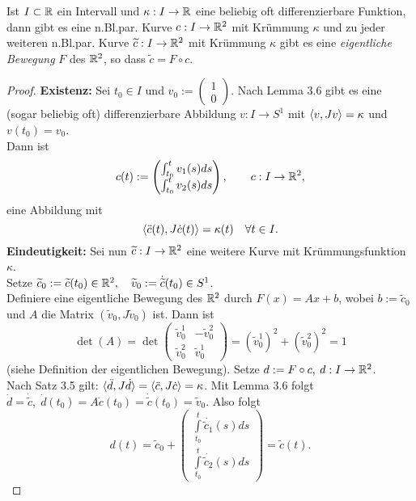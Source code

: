 \documentclass[11pt]{scrbook}
\begin{document}

\begin{st}
Ist $I \subset \mathbb{R}$  ein Intervall und $\kappa : I \to \mathbb{R}$ eine beliebig oft differenzierbare Funktion, dann gibt es eine n.Bl.par. Kurve $c: I \to \mathbb{R}^2$ mit Krümmung $\kappa$ und zu jeder weiteren n.Bl.par. Kurve $\widetilde c: I \to \mathbb{R}^2$ mit Krümmung $\kappa$ gibt es eine \emph{eigentliche Bewegung} $F$ des $\mathbb{R}^2$, so dass $\tilde c = F \circ c$.

\begin{proof}
\textbf{Existenz:}
Sei $t_0 \in I$ und $v_0 := \begin{pmatrix} 1 \\ 0 \end{pmatrix}$. Nach Lemma 3.6 gibt es eine (sogar beliebig oft) differenzierbare Abbildung $v : I \to S^1$ mit $\langle v, Jv \rangle = \kappa$ und $v(t_0) = v_0$. \\
Dann ist
\[ c(t) := \begin{pmatrix}  \int_{t_0}^t v_1(s) ds \\ \int_{t_0}^t v_2(s) ds \end{pmatrix} , \qquad c:I \to \mathbb{R}^2, \]
eine Abbildung mit 
\[ \langle \ddot c(t), J \dot c(t) \rangle = \kappa(t) \quad \forall t \in I. \]
\textbf{Eindeutigkeit:}
Sei nun $\widetilde c: I \to \mathbb{R}^2$ eine weitere Kurve mit Krümmungsfunktion $\kappa$.\\ Setze $\widetilde c_0 := \widetilde c(t_0) \in \mathbb{R}^2, \quad \widetilde v_0 := \dot{\widetilde c}(t_0) \in S^1$. \\
Definiere eine eigentliche Bewegung des $\mathbb{R}^2$ durch $F(x) = Ax + b$, wobei $b := \tilde c_0$ und $A$ die Matrix $(\tilde v_0, J \tilde v_0)$ ist. Dann ist
\[ \det(A) = \det \begin{pmatrix} \tilde v_0^1 & - \tilde v_0^2 \\ \tilde v_0^2 & \tilde v_0^1 \end{pmatrix} = (\tilde v_0^1)^2 + (\tilde v_0^2)^2 = 1 \]
(siehe Definition der eigentlichen Bewegung). Setze $d := F \circ c, \: d: I \to \mathbb{R}^2$. \\
Nach Satz 3.5 gilt: $ \langle \ddot d, J \dot d \rangle = \langle \ddot c, J \dot c \rangle = \kappa$. Mit Lemma 3.6 folgt $ \dot d = \dot{\tilde c}, \; \dot d(t_0) = A \dot c(t_0) = \dot{\tilde c}(t_0) = \tilde v_0$.
Also folgt
\[ d(t) = \tilde c_0 + \begin{pmatrix}  \int\limits_{t_0}^t \dot{\tilde c_1}(s) ds \\ \int\limits_{t_0}^t \dot{\tilde c_2}(s) ds \end{pmatrix} = \tilde c(t). \]
\end{proof}
\end{st}
\fixme[Referenzen!]
\end{document}
